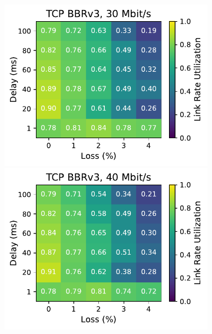 \begin{figure}[ht]
\begin{subfigure}[b]{0.22\linewidth}
        \includegraphics[width=\linewidth,trim={0 0 2cm 0},clip]{splitting/figures/heatmaps/heatmap_tcp_bbr3_30mbps.pdf}
        \includegraphics[width=\linewidth,trim={0 0 2cm 0},clip]{splitting/figures/heatmaps/heatmap_tcp_bbr3_40mbps.pdf}

\end{subfigure}
\end{figure}
